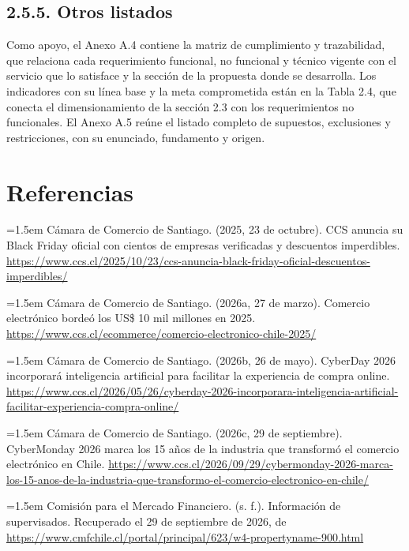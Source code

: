 \documentclass[11pt]{article}
\begin{document}
\subsection{2.5.5. Otros listados}\label{otros-listados}

Como apoyo, el Anexo A.4 contiene la matriz de cumplimiento y trazabilidad, que relaciona cada requerimiento funcional, no funcional y técnico vigente con el servicio que lo satisface y la sección de la propuesta donde se desarrolla. Los indicadores con su línea base y la meta comprometida están en la Tabla 2.4, que conecta el dimensionamiento de la sección 2.3 con los requerimientos no funcionales. El Anexo A.5 reúne el listado completo de supuestos, exclusiones y restricciones, con su enunciado, fundamento y origen.

\section*{Referencias}

\noindent\hangindent=1.5em Cámara de Comercio de Santiago. (2025, 23 de octubre). CCS anuncia su Black Friday oficial con cientos de empresas verificadas y descuentos imperdibles. \url{https://www.ccs.cl/2025/10/23/ccs-anuncia-black-friday-oficial-descuentos-imperdibles/}

\noindent\hangindent=1.5em Cámara de Comercio de Santiago. (2026a, 27 de marzo). Comercio electrónico bordeó los US\$ 10 mil millones en 2025. \url{https://www.ccs.cl/ecommerce/comercio-electronico-chile-2025/}

\noindent\hangindent=1.5em Cámara de Comercio de Santiago. (2026b, 26 de mayo). CyberDay 2026 incorporará inteligencia artificial para facilitar la experiencia de compra online. \url{https://www.ccs.cl/2026/05/26/cyberday-2026-incorporara-inteligencia-artificial-facilitar-experiencia-compra-online/}

\noindent\hangindent=1.5em Cámara de Comercio de Santiago. (2026c, 29 de septiembre). CyberMonday 2026 marca los 15 años de la industria que transformó el comercio electrónico en Chile. \url{https://www.ccs.cl/2026/09/29/cybermonday-2026-marca-los-15-anos-de-la-industria-que-transformo-el-comercio-electronico-en-chile/}

\noindent\hangindent=1.5em Comisión para el Mercado Financiero. (s. f.). Información de supervisados. Recuperado el 29 de septiembre de 2026, de \url{https://www.cmfchile.cl/portal/principal/623/w4-propertyname-900.html}
\end{document}
